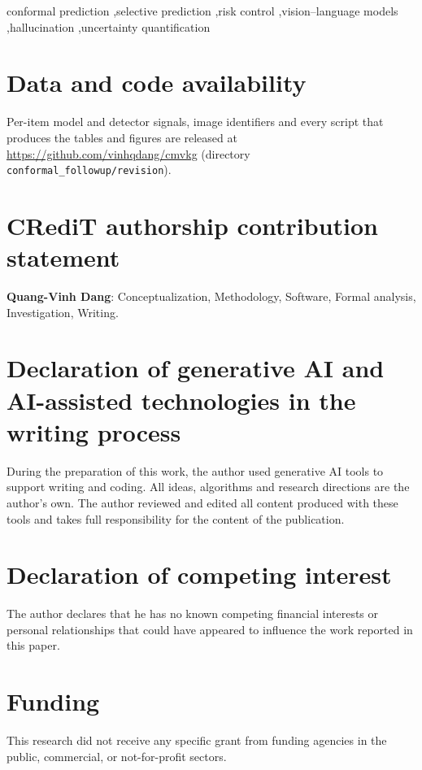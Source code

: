 \documentclass[review,number]{elsarticle}
\theoremstyle{plain}
\theoremstyle{definition}
\theoremstyle{remark}
\begin{document}
\begin{frontmatter}
\begin{keyword}
conformal prediction \sep selective prediction \sep risk control \sep vision--language models \sep hallucination \sep uncertainty quantification
\end{keyword}
\end{frontmatter}











\section*{Data and code availability}
Per-item model and detector signals, image identifiers and every script that produces the tables and figures are
released at \url{https://github.com/vinhqdang/cmvkg} (directory \texttt{conformal\_followup/revision}).

\section*{CRediT authorship contribution statement}
\textbf{Quang-Vinh Dang}: Conceptualization, Methodology, Software, Formal analysis, Investigation, Writing.

\section*{Declaration of generative AI and AI-assisted technologies in the writing process}
During the preparation of this work, the author used generative AI tools to support writing and coding. All ideas, algorithms and research directions are the author's own.
The author reviewed and edited all content produced with these tools and takes full responsibility for the content of the publication.

\section*{Declaration of competing interest}
The author declares that he has no known competing financial interests or personal relationships that could have appeared to influence the work reported in this paper.

\section*{Funding}
This research did not receive any specific grant from funding agencies in the public, commercial, or not-for-profit sectors.




\appendix

\end{document}
